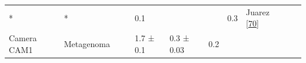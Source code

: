 \documentclass[12pt,twoside]{reedthesis}
\begin{document}
\begin{longtable}[]{@{}lllllllllll@{}}
\begin{minipage}[t]{0.04\columnwidth}
  *\strut
  \end{minipage} & \begin{minipage}[t]{0.04\columnwidth}\raggedright\strut
  *\strut
  \end{minipage} & \begin{minipage}[t]{0.06\columnwidth}\raggedright\strut
  \strut
  \end{minipage} & \begin{minipage}[t]{0.06\columnwidth}\raggedright\strut
  \strut
  \end{minipage} & \begin{minipage}[t]{0.06\columnwidth}\raggedright\strut
  0.1\strut
  \end{minipage} & \begin{minipage}[t]{0.05\columnwidth}\raggedright\strut
  \strut
  \end{minipage} & \begin{minipage}[t]{0.05\columnwidth}\raggedright\strut
  \strut
  \end{minipage} & \begin{minipage}[t]{0.03\columnwidth}\raggedright\strut
  0.3\strut
  \end{minipage} & \begin{minipage}[t]{0.11\columnwidth}\raggedright\strut
  Juarez
  {[}\protect\hyperlink{ref-juarez-vazquez_evolution_2017}{70}{]}\strut
  \end{minipage}\tabularnewline
  \begin{minipage}[t]{0.15\columnwidth}\raggedright\strut
  Camera CAM1\strut
  \end{minipage} & \begin{minipage}[t]{0.05\columnwidth}\raggedright\strut
  Metagenoma\strut
  \end{minipage} & \begin{minipage}[t]{0.04\columnwidth}\raggedright\strut
  \strut
  \end{minipage} & \begin{minipage}[t]{0.04\columnwidth}\raggedright\strut
  \strut
  \end{minipage} & \begin{minipage}[t]{0.06\columnwidth}\raggedright\strut
  1.7 ± 0.1\strut
  \end{minipage} & \begin{minipage}[t]{0.06\columnwidth}\raggedright\strut
  0.3 ± 0.03\strut
  \end{minipage} & \begin{minipage}[t]{0.06\columnwidth}\raggedright\strut
  0.2\strut

\end{minipage}
\end{longtable}
\end{document}

